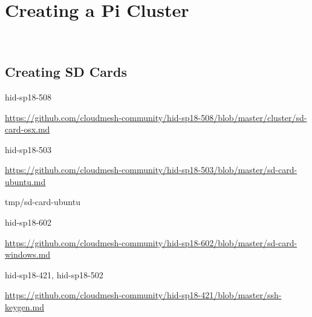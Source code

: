 \chapter{Creating a Pi Cluster}

\FILENAME\

\section{Creating SD Cards}


\begin{IU}

hid-sp18-508

\url{https://github.com/cloudmesh-community/hid-sp18-508/blob/master/cluster/sd-card-osx.md}

\end{IU}



\begin{IU}

  hid-sp18-503 

  \url{https://github.com/cloudmesh-community/hid-sp18-503/blob/master/sd-card-ubuntu.md}

\end{IU}

 {tmp/sd-card-ubuntu}


\begin{IU}

  hid-sp18-602

  \url{https://github.com/cloudmesh-community/hid-sp18-602/blob/master/sd-card-windows.md}

\end{IU}




\begin{IU}

hid-sp18-421, hid-sp18-502

\url{https://github.com/cloudmesh-community/hid-sp18-421/blob/master/ssh-keygen.md}

\end{IU}

